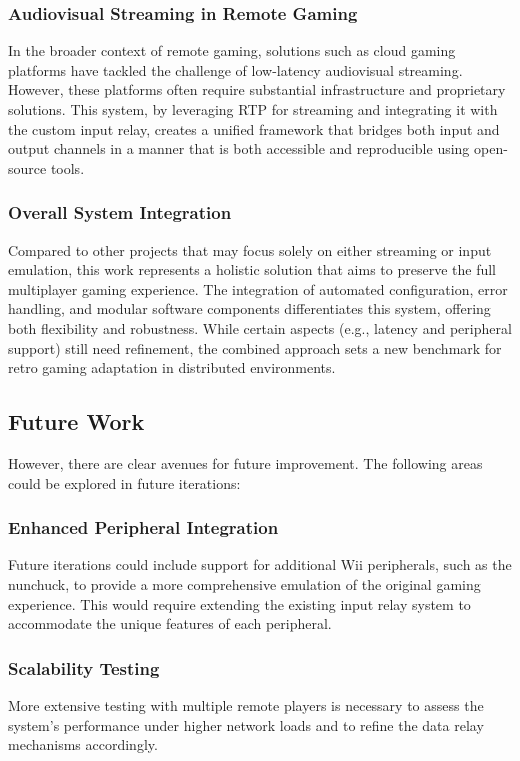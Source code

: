 \subsubsection{Audiovisual Streaming in Remote Gaming}
In the broader context of remote gaming, solutions such as cloud gaming platforms have tackled the challenge of low-latency audiovisual streaming. However, these platforms often require substantial infrastructure and proprietary solutions. This system, by leveraging RTP for streaming and integrating it with the custom input relay, creates a unified framework that bridges both input and output channels in a manner that is both accessible and reproducible using open-source tools.

\subsubsection{Overall System Integration}
Compared to other projects that may focus solely on either streaming or input emulation, this work represents a holistic solution that aims to preserve the full multiplayer gaming experience. The integration of automated configuration, error handling, and modular software components differentiates this system, offering both flexibility and robustness. While certain aspects (e.g., latency and peripheral support) still need refinement, the combined approach sets a new benchmark for retro gaming adaptation in distributed environments.


\subsection*{Future Work}
However, there are clear avenues for future improvement. The following areas could be explored in future iterations:

\subsubsection{Enhanced Peripheral Integration}
Future iterations could include support for additional Wii peripherals, such as the nunchuck, to provide a more comprehensive emulation of the original gaming experience. This would require extending the existing input relay system to accommodate the unique features of each peripheral.

\subsubsection{Scalability Testing}
More extensive testing with multiple remote players is necessary to assess the system’s performance under higher network loads and to refine the data relay mechanisms accordingly.

